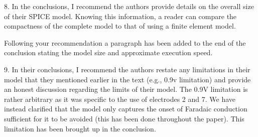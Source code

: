 \documentclass[journal, a4paper]{IEEEtran}
\begin{document}
{    8. In the conclusions, I recommend the authors provide details on the overall size of their SPICE model. Knowing this information, a reader can compare the compactness of the complete model to that of using a finite element model.

    {
        \color{blue}
        Following your recommendation a paragraph has been added to the end of the conclusion stating the model size and approximate execution speed.
    }

    9. In their conclusions, I recommend the authors restate any limitations in their model that they mentioned earlier in the text (e.g., 0.9v limitation) and provide an honest discussion regarding the limits of their model.
    {
        \color{blue}
        The 0.9V limitation is rather arbitrary as it was specific to the use of electrodes 2 and 7. We have instead clarified that the model only captures the onset of Faradaic conduction sufficient for it to be avoided (this has been done throughout the paper). This limitation has been brought up in the conclusion.
    }
}
\end{document}
